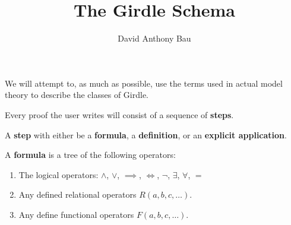 \documentclass{article}
\title{The Girdle Schema}
\author{David Anthony Bau}
\begin{document}
\maketitle

We will attempt to, as much as possible, use the terms used in actual model theory to describe the classes of Girdle.

Every proof the user writes will consist of a sequence of \textbf{steps}.

A \textbf{step} with either be a \textbf{formula}, a \textbf{definition}, or an \textbf{explicit application}.

A \textbf{formula} is a tree of the following operators:

\begin{enumerate}
  \item The logical operators: $\land$, $\lor$, $\implies$, $\iff$, $\lnot$, $\exists$, $\forall$, $=$
  \item Any defined relational operators $R(a, b, c, \dots)$.
  \item Any define functional operators $F(a, b, c, \dots)$.
\end{enumerate}
\end{document}
